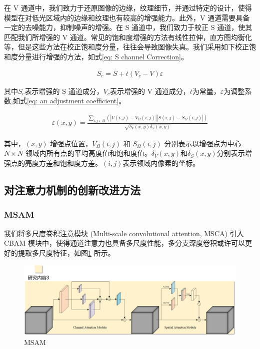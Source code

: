 \documentclass[a4paper]{ctexart}
\begin{document}
	在 V 通道中，我们致力于还原图像的边缘，纹理细节，并通过特定的设计，使得模型在对低光区域内的边缘和纹理也有较高的增强能力。此外，V 通道需要具备一定的去噪能力，抑制噪声的增强。在 S 通道中，我们致力于校正 S 通道，使其匹配我们所增强的 V 通道。常见的饱和度增强的方法有线性拉伸，直方图均衡化等，但是这些方法在校正饱和度分量，往往会导致图像失真。我们采用如下校正饱和度分量进行增强的方法，如式\ref{eq: S channel Correction}。
	
	\begin{equation}
		\begin{aligned}
			S_{c} = S + t(V_{c} - V)\varepsilon
		\end{aligned}
		\label{eq: S channel Correction}
	\end{equation}
	
	其中$S_{c}$表示增强的 S 通道成分，$V_{c}$表示增强的 V 通道成分，$t$为常量，$\varepsilon$为调整系数,如式\ref{eq: an adjustment coefficient}。
	
	\begin{equation}
		\begin{aligned}
			\varepsilon (x, y) = \frac{\sum\limits_{i,j \in \Omega} \left(\left|V(i,j)-\bar{V}_{\Omega}(i,j)\right|\left|S(i,j)-\bar{S}_{\Omega}(i,j)\right|\right)}{\sqrt{\delta_{V}(x,y)\delta_{S}(x,y)}}
		\end{aligned}
		\label{eq: an adjustment coefficient}
	\end{equation}
	
	其中，$(x,y)$ 增强点位置，$\bar{V}_{\Omega}(i,j)$ 和 $\bar{S}_{\Omega}(i,j)$ 分别表示以增强点为中心 $N \times N$ 领域内所有点的平均高度值和饱和度值。$\delta_{V}(x,y)$和$\delta_{S}(x,y)$分别表示增强点的亮度方差和饱和度方差。$(i,j)$表示领域内像素的坐标。
	
	
	\FloatBarrier
	
	\subsection*{对注意力机制的创新改进方法}
	
	\subsubsection*{MSAM}
	
	我们将多尺度卷积注意模块 (Multi-scale convolutional attention, MSCA) 引入 CBAM 模块中，使得通道注意力也具备多尺度性能，多分支深度卷积或许可以更好的提取多尺度特征，如图\ref{fig: MSAM} 所示。
	
	\begin{figure}[htbp]
		\centering
		\includegraphics[width=0.8\linewidth]{picture/LLIE/Experiment/Attention/MSAM}
		\caption{MSAM}
		\label{fig: MSAM}
	\end{figure}
	
\end{document}
